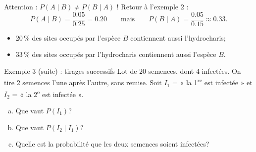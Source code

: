 \documentclass{BeamerTemplate}
\begin{document}
\begin{frame}[t]{Attention : $P(A \mid B) \neq P(B \mid A)$ !}
  Retour à l'exemple 2 :
  \[
    P(A \mid B) = \frac{0.05}{0.25} = 0.20
    \qquad \text{mais} \qquad
    P(B \mid A) = \frac{0.05}{0.15} \approx 0.33.
  \]
  \begin{itemize}
    \item 20\,\% des sites occupés par l'espèce $B$ contiennent aussi
      l'hydrocharis;
    \item 33\,\% des sites occupés par l'hydrocharis contiennent aussi
      l'espèce $B$.
  \end{itemize}

  \medskip

  \medskip
\end{frame}

\begin{frame}[t]{Exemple 3 (suite) : tirages successifs}
  Lot de 20 semences, dont 4 infectées. On tire 2 semences \alert{l'une après
  l'autre}, sans remise. Soit $I_1$ = « la 1\textsuperscript{re} est infectée »
  et $I_2$ = « la 2\textsuperscript{e} est infectée ».

  \begin{enumerate}[a)]\itemsep 7mm
    \item Que vaut $P(I_1)$?
    \item Que vaut $P(I_2 \mid I_1)$?
    \item Quelle est la probabilité que les deux semences soient infectées?

  \end{enumerate}

  \medskip
\end{frame}
\end{document}

